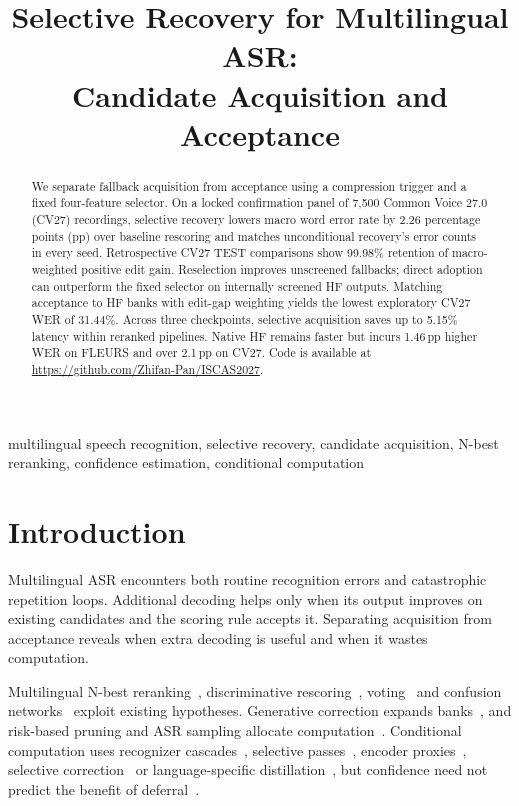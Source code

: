 \documentclass[conference,letterpaper]{IEEEtran}
\title{Selective Recovery for Multilingual ASR:\\Candidate Acquisition and Acceptance}
\begin{document}
\maketitle\flushbottom

\setlength{\parskip}{0pt plus 4pt}
\setlength{\abovedisplayskip}{3pt plus 2pt minus 1pt}
\setlength{\belowdisplayskip}{3pt plus 2pt minus 1pt}
\setlength{\belowdisplayshortskip}{3pt plus 2pt minus 1pt}
\setlength{\abovecaptionskip}{4pt}
\begin{abstract}
We separate fallback acquisition from acceptance using a compression trigger and a fixed four-feature selector. On a locked confirmation panel of 7,500 Common Voice 27.0 (CV27) recordings, selective recovery lowers macro word error rate by 2.26 percentage points (pp) over baseline rescoring and matches unconditional recovery's error counts in every seed. Retrospective CV27 TEST comparisons show 99.98\% retention of macro-weighted positive edit gain. Reselection improves unscreened fallbacks; direct adoption can outperform the fixed selector on internally screened HF outputs. Matching acceptance to HF banks with edit-gap weighting yields the lowest exploratory CV27 WER of 31.44\%. Across three checkpoints, selective acquisition saves up to 5.15\% latency within reranked pipelines. Native HF remains faster but incurs 1.46\,pp higher WER on FLEURS and over 2.1\,pp on CV27. Code is available at \url{https://github.com/Zhifan-Pan/ISCAS2027}.
\end{abstract}
\begin{IEEEkeywords}
multilingual speech recognition, selective recovery, candidate acquisition, N-best reranking, confidence estimation, conditional computation
\end{IEEEkeywords}

\section{Introduction}
Multilingual ASR encounters both routine recognition errors and catastrophic repetition loops. Additional decoding helps only when its output improves on existing candidates and the scoring rule accepts it. Separating acquisition from acceptance reveals when extra decoding is useful and when it wastes computation.

Multilingual N-best reranking~\cite{gaur2022,yan2025wild}, discriminative rescoring~\cite{rescorebert,discriminative2023,audioattention2019}, voting~\cite{fiscus1997} and confusion networks~\cite{mangu2000} exploit existing hypotheses. Generative correction expands banks~\cite{kuo2026framework,dutta2022,progres2024,whisperingllama}, and risk-based pruning and ASR sampling allocate computation~\cite{cheng2023pruning,jinnai2025mbrasr}. Conditional computation uses recognizer cascades~\cite{xue2025sima}, selective passes~\cite{aleksic2025}, encoder proxies~\cite{fathullah2024proxies}, selective correction~\cite{lim2025hybrid} or language-specific distillation~\cite{ferraz2024distil}, but confidence need not predict the benefit of deferral~\cite{jitkrittum2023cascade}.
\end{document}
